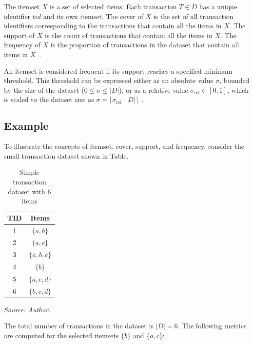 The itemset $X$ is a set of selected items. Each transaction $T \in D$ has a unique identifier $tid$ and its own itemset. The cover of $X$ is the set of all transaction identifiers corresponding to the transactions that contain all the items in $X$. The support of $X$ is the count of transactions that contain all the items in $X$. The frequency of $X$ is the proportion of transactions in the dataset that contain all items in $X$~\parencite{Goethals2003}.

An itemset is considered frequent if its support reaches a specified minimum threshold. This threshold can be expressed either as an absolute value $\sigma$, bounded by the size of the dataset ($0 \leq \sigma \leq |D|$), or as a relative value $\sigma_{\text{rel}} \in [0,1]$, which is scaled to the dataset size as $\sigma = \lceil \sigma_{\text{rel}} \cdot |D| \rceil$~\parencite{Goethals2003}.

\subsection{Example}
To illustrate the concepts of itemset, cover, support, and frequency, consider the small transaction dataset shown in Table.

\begin{table}[h!]
\centering
\caption{Simple transaction dataset with 6 items}
\begin{threeparttable}
\label{tab:dataset}
\begin{tabular}{|c|c|}
\hline
\textbf{TID} & \textbf{Items} \\
\hline
1 & $\{a, b\}$ \\
2 & $\{a, c\}$ \\
3 & $\{a, b, c\}$ \\
4 & $\{b\}$ \\
5 & $\{a, c, d\}$ \\
6 & $\{b, c, d\}$ \\
\hline
\end{tabular}
\begingroup
\let\item\relax
\item \textit{Source: Author.}
\endgroup
\end{threeparttable}
\end{table}

The total number of transactions in the dataset is $|D| = 6$. The following metrics are computed for the selected itemsets $\{b\}$ and $\{a, c\}$:

